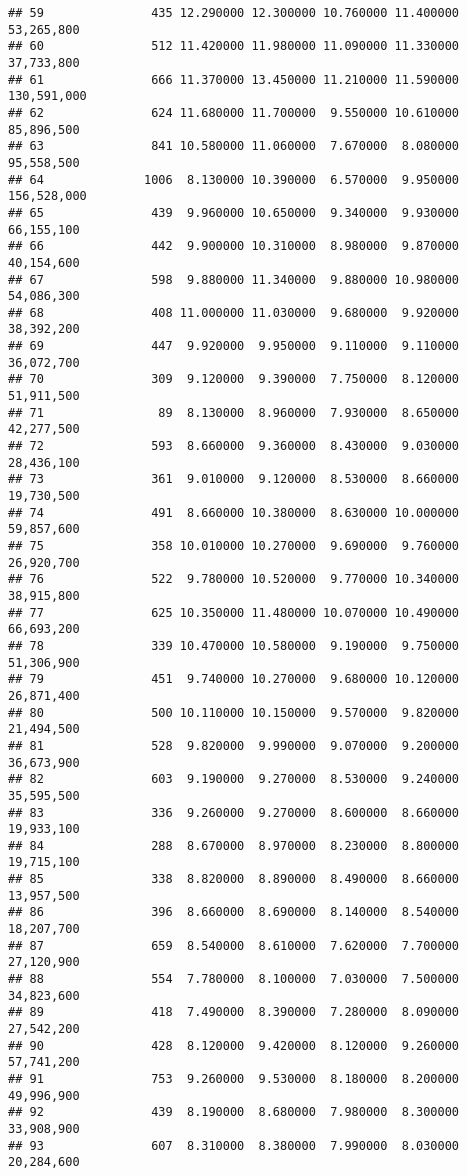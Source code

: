 \documentclass[]{article}
\begin{document}
\begin{verbatim}
## 59               435 12.290000 12.300000 10.760000 11.400000  53,265,800
## 60               512 11.420000 11.980000 11.090000 11.330000  37,733,800
## 61               666 11.370000 13.450000 11.210000 11.590000 130,591,000
## 62               624 11.680000 11.700000  9.550000 10.610000  85,896,500
## 63               841 10.580000 11.060000  7.670000  8.080000  95,558,500
## 64              1006  8.130000 10.390000  6.570000  9.950000 156,528,000
## 65               439  9.960000 10.650000  9.340000  9.930000  66,155,100
## 66               442  9.900000 10.310000  8.980000  9.870000  40,154,600
## 67               598  9.880000 11.340000  9.880000 10.980000  54,086,300
## 68               408 11.000000 11.030000  9.680000  9.920000  38,392,200
## 69               447  9.920000  9.950000  9.110000  9.110000  36,072,700
## 70               309  9.120000  9.390000  7.750000  8.120000  51,911,500
## 71                89  8.130000  8.960000  7.930000  8.650000  42,277,500
## 72               593  8.660000  9.360000  8.430000  9.030000  28,436,100
## 73               361  9.010000  9.120000  8.530000  8.660000  19,730,500
## 74               491  8.660000 10.380000  8.630000 10.000000  59,857,600
## 75               358 10.010000 10.270000  9.690000  9.760000  26,920,700
## 76               522  9.780000 10.520000  9.770000 10.340000  38,915,800
## 77               625 10.350000 11.480000 10.070000 10.490000  66,693,200
## 78               339 10.470000 10.580000  9.190000  9.750000  51,306,900
## 79               451  9.740000 10.270000  9.680000 10.120000  26,871,400
## 80               500 10.110000 10.150000  9.570000  9.820000  21,494,500
## 81               528  9.820000  9.990000  9.070000  9.200000  36,673,900
## 82               603  9.190000  9.270000  8.530000  9.240000  35,595,500
## 83               336  9.260000  9.270000  8.600000  8.660000  19,933,100
## 84               288  8.670000  8.970000  8.230000  8.800000  19,715,100
## 85               338  8.820000  8.890000  8.490000  8.660000  13,957,500
## 86               396  8.660000  8.690000  8.140000  8.540000  18,207,700
## 87               659  8.540000  8.610000  7.620000  7.700000  27,120,900
## 88               554  7.780000  8.100000  7.030000  7.500000  34,823,600
## 89               418  7.490000  8.390000  7.280000  8.090000  27,542,200
## 90               428  8.120000  9.420000  8.120000  9.260000  57,741,200
## 91               753  9.260000  9.530000  8.180000  8.200000  49,996,900
## 92               439  8.190000  8.680000  7.980000  8.300000  33,908,900
## 93               607  8.310000  8.380000  7.990000  8.030000  20,284,600

\end{verbatim}
\end{document}
